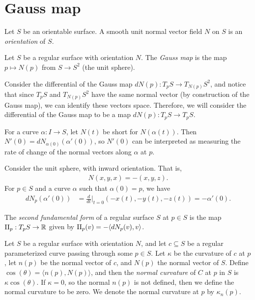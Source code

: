 \section{Gauss map}

\begin{defn}
    Let $S$ be an orientable surface. A smooth unit normal vector field $N$ on $S$ is an \emph{orientation} of $S$.
\end{defn}

\begin{defn}
    Let $S$ be a regular surface with orientation $N$. The \emph{Gauss map} is the map $p \mapsto N(p)$ from $S \to S^2$ (the unit sphere).
\end{defn}

\begin{rmk}
    Consider the differential of the Gauss map $dN(p): T_pS \to T_{N(p)}S^2$, and notice that since $T_pS$ and $T_{N(p)}S^2$ have the same normal vector (by construction of the Gauss map), we can identify these vectors space. Therefore, we will consider the differential of the Gauss map to be a map $dN(p): T_pS \to T_pS$.
\end{rmk}

\begin{rmk}
    For a curve $\alpha: I \to S$, let $N(t)$ be short for $N(\alpha(t))$. Then $N'(0) = dN_{\alpha(0)}(\alpha'(0))$, so $N'(0)$ can be interpreted as measuring the rate of change of the normal vectors along $\alpha$ at $p$. 
\end{rmk}

\begin{exmp}
    Consider the unit sphere, with inward orientation. That is,
    \begin{align*}
        N(x,y,x) = -(x,y,z).
    \end{align*}
    For $p \in S$ and a curve $\alpha$ such that $\alpha(0) = p$, we have
    \begin{align*}
        dN_p(\alpha'(0)) &= \frac{d}{dt}|_{t=0}(-x(t), -y(t), -z(t)) = -\alpha'(0).
    \end{align*}
\end{exmp}

\begin{defn}
    The \emph{second fundamental form} of a regular surface $S$ at $p \in S$ is the map $\operatorname{II}_p: T_pS \to \mathbb{R}$ given by $\operatorname{II}_p(v) = -\langle dN_p(v), v\rangle$.
\end{defn}

\begin{defn}
    Let $S$ be a regular surface with orientation $N$, and let $c \subseteq S$ be a regular parameterized curve passing through some $p \in S$. Let $\kappa$ be the curvature of $c$ at $p$, let $n(p)$ be the normal vector of $c$, and $N(p)$ the normal vector of $S$. Define $\cos(\theta) = \langle n(p), N(p) \rangle$, and then the \emph{normal curvature} of $C$ at $p$ in $S$ is $\kappa\cos(\theta)$. If $\kappa = 0$, so the normal $n(p)$ is not defined, then we define the normal curvature to be zero. We denote the normal curvature at $p$ by $\kappa_n(p)$.
\end{defn}

